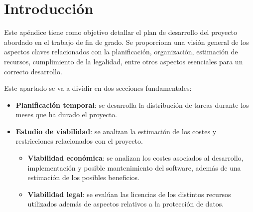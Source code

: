 
\section{Introducción}
\label{sec:PlanProyectoIntroduccion}
Este apéndice tiene como objetivo detallar el plan de desarrollo del proyecto abordado en el trabajo de fin de grado. Se proporciona una visión general de los aspectos claves relacionados con la planificación, organización, estimación de recursos, cumplimiento de la legalidad, entre otros aspectos esenciales para un correcto desarrollo.

Este apartado se va a dividir en dos secciones fundamentales:
\begin{itemize}
    \item \textbf{Planificación temporal}: se desarrolla la distribución de tareas durante los meses que ha durado el proyecto.
    \item \textbf{Estudio de viabilidad}: se analizan la estimación de los costes y restricciones relacionados con el proyecto.
    \begin{itemize}
        \item \textbf{Viabilidad económica}: se analizan los costes asociados al desarrollo, implementación y posible mantenimiento del software, además de una estimación de los posibles beneficios.
        \item \textbf{Viabilidad legal}: se evalúan las licencias de los distintos recursos utilizados además de aspectos relativos a la protección de datos.
    \end{itemize}
\end{itemize}


